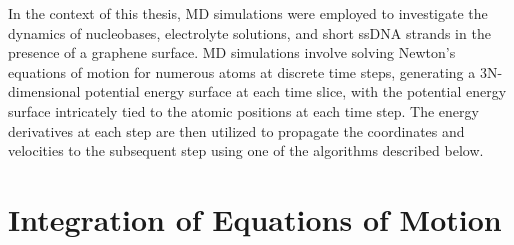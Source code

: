 In the context of this thesis, MD simulations were employed to investigate the dynamics of nucleobases, electrolyte solutions, and short ssDNA strands in the presence of a graphene surface. MD simulations involve solving Newton's equations of motion for numerous atoms at discrete time steps, generating a 3N-dimensional potential energy surface at each time slice, with the potential energy surface intricately tied to the atomic positions at each time step. The energy derivatives at each step are then utilized to propagate the coordinates and velocities to the subsequent step using one of the algorithms described below.

\section[Integration of Equations of Motion]{Integration of Equations of Motion}
